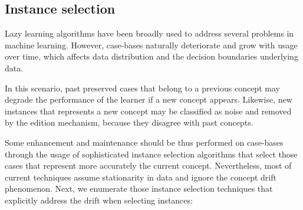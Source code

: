 \documentclass[preprint,12pt]{elsarticle}
\begin{document}
\subsection{Instance selection}
\label{subsec:isel}

Lazy learning algorithms have been broadly used to address several problems in machine learning. However, case-bases naturally deteriorate and grow with usage over time, which affects data distribution and the decision boundaries underlying data.

In this scenario, past preserved cases that belong to a previous concept may degrade the performance of the learner if a new concept appears. Likewise, new instances that represents a new concept may be classified as noise and removed by the edition mechanism, because they disagree with past concepts. 

Some enhancement and maintenance should be thus performed on case-bases through the usage of sophisticated instance selection algorithms that select those cases that represent more accurately the current concept. Nevertheless, most of current techniques assume stationarity in data and ignore the concept drift phenomenon. Next, we enumerate those instance selection techniques that explicitly address the drift when selecting instances:
\end{document}
